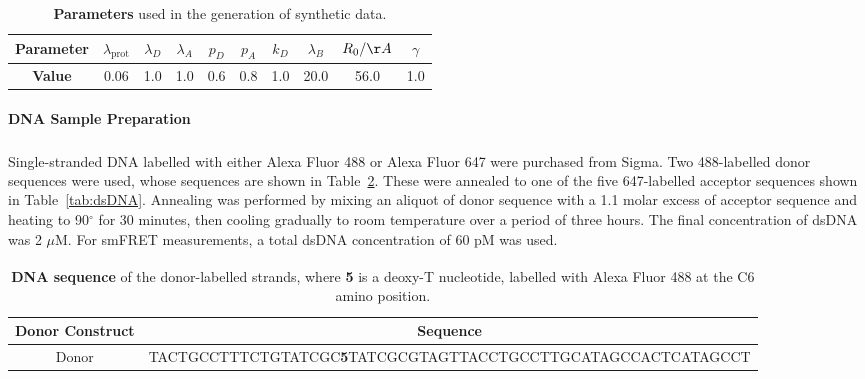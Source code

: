 \begin{center}
\begin{table}[ht]
\caption{{\bf{Parameters}} used in the generation of synthetic data.}
\begin{tabular}{|cccccccccc|}
\hline
\textbf{Parameter} & $\lambda_{\text{prot}}$ & $\lambda_{D}$ & $\lambda_{A}$ & $p_D$ & $p_A$ & $k_D$ & $\lambda_{B}$ & $R_0 / \AA$ & $\gamma$ \\
\hline
\textbf{Value} & 0.06 & 1.0 & 1.0 & 0.6 & 0.8 & 1.0 & 20.0 & 56.0 & 1.0 \\
\hline
\end{tabular}
\label{tab:shared}
\end{table} 
\end{center}

\paragraph*{DNA Sample Preparation}
\label{subsect:DNA_prep}
Single-stranded DNA labelled with either Alexa Fluor\textsuperscript{\textregistered} 488 or Alexa Fluor\textsuperscript{\textregistered} 647 were purchased from Sigma.  Two 488-labelled donor sequences were used, whose sequences are shown in Table~\ref{tab:donor}.  These were annealed to one of the five 647-labelled acceptor sequences shown in Table~\ref{tab:dsDNA}.  Annealing was performed by mixing an aliquot of donor sequence with a 1.1 molar excess of acceptor sequence and heating to 90$^{\circ}$ for 30 minutes, then cooling gradually to room temperature over a period of three hours.  The final concentration of dsDNA was 2 $\mu$M. For smFRET measurements, a total dsDNA concentration of 60 pM was used. 

\begin{center}
\begin{table}[ht]
\caption{{\bf{DNA sequence}} of the donor-labelled strands, where \textbf{5} is a deoxy-T nucleotide, labelled with Alexa Fluor\textsuperscript{\textregistered} 488 at the C6 amino position.}
\footnotesize
\begin{tabular}{|c|c|}
\hline
\textbf{Donor Construct} & \textbf{Sequence}\\
\hline
Donor & \scriptsize{TACTGCCTTTCTGTATCGC\textbf{5}TATCGCGTAGTTACCTGCCTTGCATAGCCACTCATAGCCT}\\
\hline
\end{tabular}
\label{tab:donor} 
\end{table} 
\end{center}  

